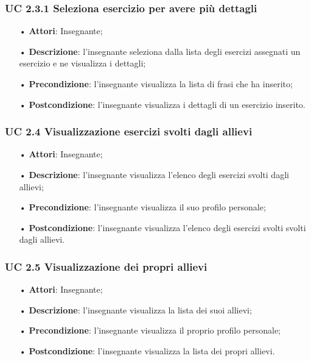 \subsubsection{UC 2.3.1 Seleziona esercizio per avere più dettagli}
\begin{itemize}
	\item[•] \textbf{Attori}: Insegnante;
	\item[•] \textbf{Descrizione}: l'insegnante seleziona dalla lista degli esercizi assegnati un esercizio e ne visualizza i dettagli;
	\item[•] \textbf{Precondizione}: l'insegnante visualizza la lista di frasi che ha inserito;
	\item[•] \textbf{Postcondizione}: l'insegnante visualizza i dettagli di un esercizio inserito.
\end{itemize}




\subsubsection{UC 2.4 Visualizzazione esercizi svolti dagli allievi}

\begin{itemize}
	\item[•] \textbf{Attori}: Insegnante;
	\item[•] \textbf{Descrizione}:  l'insegnante visualizza l'elenco degli esercizi svolti dagli allievi;
	\item[•] \textbf{Precondizione}: l'insegnante visualizza il suo profilo personale;
	\item[•] \textbf{Postcondizione}: l'insegnante visualizza l'elenco degli esercizi svolti svolti dagli allievi.
\end{itemize}

\subsubsection{UC 2.5 Visualizzazione dei propri allievi}
\begin{itemize}
	\item[•] \textbf{Attori}: Insegnante;
	\item[•] \textbf{Descrizione}: l'insegnante visualizza la lista dei suoi allievi;
	\item[•] \textbf{Precondizione}: l'insegnante visualizza il proprio profilo personale;
	\item[•] \textbf{Postcondizione}: l'insegnante visualizza la lista dei propri allievi.
\end{itemize}




